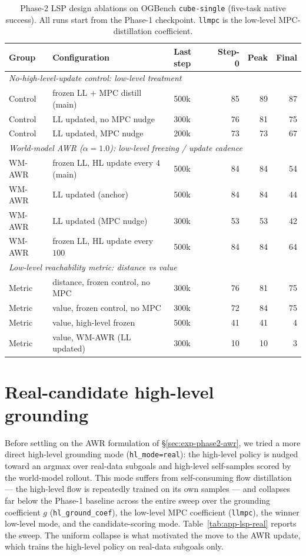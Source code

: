 \begin{table}[h]
\centering
\caption{Phase-2 LSP design ablations on OGBench \texttt{cube-single}
(five-task native success). All runs start from the Phase-1 checkpoint.
\texttt{llmpc} is the low-level MPC-distillation coefficient.}
\label{tab:app-lsp-ablations}
\begin{tabular}{lllrrr}
\toprule
Group & Configuration & Last step & Step-0 & Peak & Final \\
\midrule
\multicolumn{6}{l}{\emph{No-high-level-update control: low-level treatment}} \\
Control & frozen LL $+$ MPC distill (main) & 500k & 85 & 89 & 87 \\
Control & LL updated, no MPC nudge         & 300k & 76 & 81 & 75 \\
Control & LL updated, MPC nudge            & 200k & 73 & 73 & 67 \\
\midrule
\multicolumn{6}{l}{\emph{World-model AWR ($\alpha=1.0$): low-level freezing / update cadence}} \\
WM-AWR & frozen LL, HL update every $4$ (main) & 500k & 84 & 84 & 54 \\
WM-AWR & LL updated (anchor)                    & 500k & 84 & 84 & 44 \\
WM-AWR & LL updated (MPC nudge)                 & 300k & 53 & 53 & 42 \\
WM-AWR & frozen LL, HL update every $100$       & 500k & 84 & 84 & 64 \\
\midrule
\multicolumn{6}{l}{\emph{Low-level reachability metric: distance vs value}} \\
Metric & distance, frozen control, no MPC & 300k & 76 & 81 & 75 \\
Metric & value, frozen control, no MPC    & 300k & 72 & 84 & 75 \\
Metric & value, high-level frozen          & 500k & 41 & 41 & 4 \\
Metric & value, WM-AWR (LL updated)        & 300k & 10 & 10 & 3 \\
\bottomrule
\end{tabular}
\end{table}

\section{Real-candidate high-level grounding}
\label{app:lsp-real}

Before settling on the AWR formulation of \S\ref{sec:exp-phase2-awr}, we
tried a more direct high-level grounding mode (\texttt{hl\_mode=real}):
the high-level policy is nudged toward an argmax over real-data subgoals
and high-level self-samples scored by the world-model rollout. This mode
suffers from self-consuming flow distillation --- the high-level flow is
repeatedly trained on its own samples --- and collapses far below the
Phase-1 baseline across the entire sweep over the grounding coefficient
$g$ (\texttt{hl\_ground\_coef}), the low-level MPC coefficient
(\texttt{llmpc}), the winner low-level mode, and the candidate-scoring
mode. Table~\ref{tab:app-lsp-real} reports the sweep. The uniform
collapse is what motivated the move to the AWR update, which trains the
high-level policy on real-data subgoals only.

